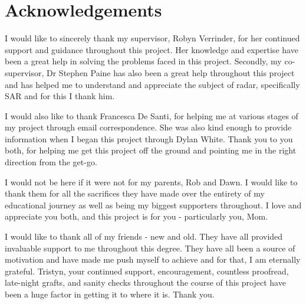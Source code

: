 \chapter{Acknowledgements}		
\label{ch:ack}

I would like to sincerely thank my supervisor, Robyn Verrinder, for her continued support and guidance throughout this project. Her knowledge and expertise have been a great help in solving the problems faced in this project. Secondly, my co-supervisor, Dr Stephen Paine has also been a great help throughout this project and has helped me to understand and appreciate the subject of radar, specifically SAR and for this I thank him. 

I would also like to thank Francesca De Santi, for helping me at various stages of my project through email correspondence. She was also kind enough to provide information when I began this project through Dylan White. Thank you to you both, for helping me get this project off the ground and pointing me in the right direction from the get-go.

I would not be here if it were not for my parents, Rob and Dawn. I would like to thank them for all the sacrifices they have made over the entirety of my educational journey as well as being my biggest supporters throughout. I love and appreciate you both, and this project is for you - particularly you, Mom.

I would like to thank all of my friends - new and old. They have all provided invaluable support to me throughout this degree. They have all been a source of motivation and have made me push myself to achieve and for that, I am eternally grateful. Tristyn, your continued support, encouragement, countless proofread, late-night grafts, and sanity checks throughout the course of this project have been a huge factor in getting it to where it is. Thank you.





